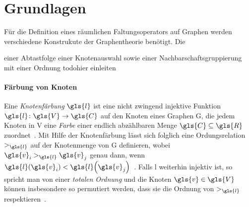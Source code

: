 \section{Grundlagen}
\label{raeumliche_grundlagen}

Für die Definition eines räumlichen Faltungsoperators auf Graphen werden verschiedene Konstrukute der Graphentheorie benötigt.
Die


einer Abtastfolge \bzw{} einer Knotenauswahl sowie einer Nachbarschaftsgruppierung mit einer Ordnung
todo{hier einleiten}

\paragraph{Färbung von Knoten}
\label{faerbung_von_knoten}

Eine \emph{Knotenfärbung} $\gls{l}$ ist eine nicht zwingend injektive Funktion $\gls{l} \colon \gls{V} \to \gls{C}$ auf den Knoten eines Graphen \gls{G}, die jedem Knoten in \gls{V} eine \emph{Farbe} einer endlich abzählbaren Menge $\gls{C} \subseteq \gls{R}$ zuordnet~\cite{patchy}.
Mit Hilfe der Knotenfärbung lässt sich folglich eine Ordungsrelation $>_{\gls{l}}$ auf der Knotenmenge von \gls{G} definieren, wobei $\gls{v}_i >_{\gls{l}} \gls{v}_j$ genau dann, wenn $\gls{l}\left(\gls{v}_i\right) < \gls{l}\left(\gls{v}_j\right)$~\cite{patchy}.
Falls \gls{l} weiterhin injektiv ist, so spricht man von einer \emph{totalen Ordnung} und die Knoten $\gls{v} \in \gls{V}$ können insbesondere so permutiert werden, dass sie die Ordnung von $>_{\gls{l}}$ respektieren~\cite{patchy}.

